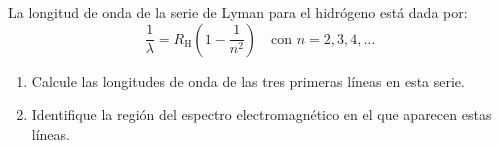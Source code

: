 \item La longitud de onda de la serie de Lyman para el hidrógeno está dada por:
$$ \frac{1}{\lambda} = R_{\text{H}} \left( 1 - \frac{1}{n^2} \right) \quad \text{con } n = 2, 3, 4, \dots $$
\begin{enumerate}
    \item Calcule las longitudes de onda de las tres primeras líneas en esta serie.
    \item Identifique la región del espectro electromagnético en el que aparecen estas líneas.
\end{enumerate}
